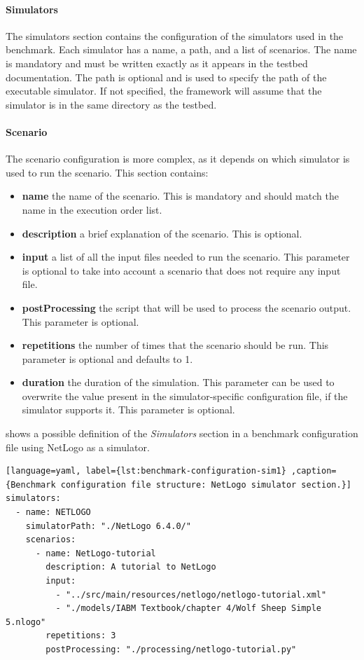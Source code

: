 \documentclass[12pt,a4paper,openright,twoside]{book}
\begin{document}
\paragraph*{Simulators}
The simulators section contains the configuration of the simulators used in the benchmark.
Each simulator has a name, a path, and a list of scenarios.
The name is mandatory and must be written exactly as it appears in the testbed documentation.
The path is optional and is used to specify the path of the executable simulator.
If not specified, the framework will assume that the simulator is in the same directory as the testbed.

\paragraph*{Scenario}
The scenario configuration is more complex, as it depends on which simulator is used to run the scenario.
This section contains:
\begin{itemize}
  \item \textbf{name} the name of the scenario. This is mandatory and should match the name in the execution order list.
  \item \textbf{description} a brief explanation of the scenario. This is optional.
  \item \textbf{input} a list of all the input files needed to run the scenario. This parameter is optional to take into account a scenario that does not require any input file.
  \item \textbf{postProcessing} the script that will be used to process the scenario output. This parameter is optional.
  \item \textbf{repetitions} the number of times that the scenario should be run. This parameter is optional and defaults to 1.
  \item \textbf{duration} the duration of the simulation. This parameter can be used to overwrite the value present in the simulator-specific configuration file, if the simulator supports it. This parameter is optional.
\end{itemize}

 shows a possible definition of the \emph{Simulators} section in a benchmark configuration file using NetLogo as a simulator.

\begin{lstlisting}[language=yaml, label={lst:benchmark-configuration-sim1} ,caption={Benchmark configuration file structure: NetLogo simulator section.}]
simulators:
  - name: NETLOGO
    simulatorPath: "./NetLogo 6.4.0/"
    scenarios:
      - name: NetLogo-tutorial
        description: A tutorial to NetLogo
        input:
          - "../src/main/resources/netlogo/netlogo-tutorial.xml"
          - "./models/IABM Textbook/chapter 4/Wolf Sheep Simple 5.nlogo"
        repetitions: 3
        postProcessing: "./processing/netlogo-tutorial.py"
\end{lstlisting}
\end{document}
